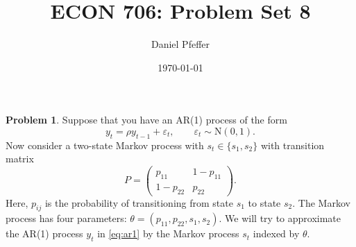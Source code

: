 \documentclass[oneside,reqno]{amsart}
\title{ECON 706: Problem Set 8}
\author{Daniel Pfeffer}
\date{\today}
\newcommand{\eps}{\varepsilon}
\newcommand{\N}{\mathrm N}
\theoremstyle{definition}
\newtheorem{prob}{Problem}
\begin{document}
\maketitle

\begin{prob}
Suppose that you have an AR(1) process of the form 
\begin{equation}\label{eq:ar1}
	y_t = \rho y_{t-1} + \eps_t,
	\qquad \eps_t \sim \N(0,1).
\end{equation}
Now consider a two-state Markov process with $s_t \in \{s_1, s_2\}$ with transition matrix
\begin{equation}\label{eq:P}
	P = \begin{pmatrix}
		p_{11} & 1-p_{11} \\
		1- p_{22} & p_{22}
	\end{pmatrix}.
\end{equation}
Here, $p_{ij}$ is the probability of transitioning from state $s_1$ to state $s_2$. The Markov process has four parameters: $\theta = (p_{11}, p_{22}, s_1, s_2)$. We will try to approximate the AR(1) process $y_t$ in \eqref{eq:ar1} by the Markov process $s_t$ indexed by $\theta$.
\end{prob}
\end{document}
